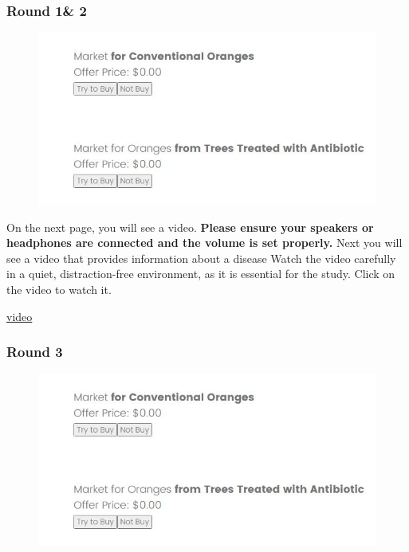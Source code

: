 \documentclass[12pt]{article}
\begin{document}
\clearpage

 \subsubsection*{Round 1\& 2}


 \begin{figure}[H]
    \centering
    \includegraphics[width=0.8\linewidth]{GSO.JPG}
    
    \label{fig:GSO}
\end{figure}

 \vspace{0.5cm}


On the next page, you will see a video. \textbf{Please ensure your speakers or headphones are connected and the volume is set properly.} Next you will see a video that provides information about a disease Watch the video carefully in a quiet, distraction-free environment, as it is essential for the study.
\vspace{0.5cm}
Click on the video to watch it.

\href{https://www.youtube.com/watch?v=_AqMBjB0ChM}{video}
\clearpage


 \subsubsection*{Round 3}



\begin{figure}[H]
    \centering
    \includegraphics[width=\linewidth]{GSO.JPG}
    \caption{}
    \label{fig:Appendix_GSO_game}
\end{figure}
 
\end{document}
